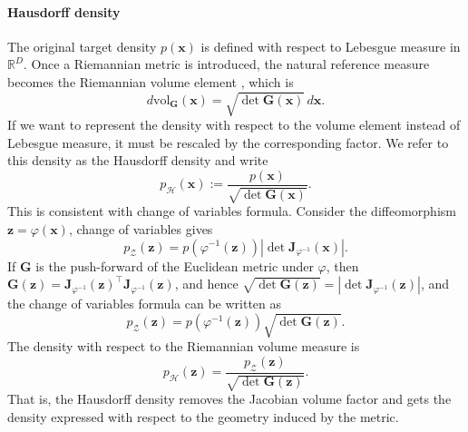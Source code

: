 \paragraph{Hausdorff density}
The original target density $p(\boldsymbol{x})$ is defined with respect to Lebesgue measure in $\mathbb{R}^D$. Once a Riemannian metric is introduced, the natural reference measure becomes the Riemannian volume element \citep{Lee2018}, which is
\begin{equation*}
    d\mathrm{vol}_{\mathbf{G}}(\boldsymbol{x}) = \sqrt{\det \mathbf{G}(\boldsymbol{x})}\,d\boldsymbol{x}.
\end{equation*}
If we want to represent the density with respect to the volume element instead of Lebesgue measure, it must be rescaled by the corresponding factor.  We refer to this density as the Hausdorff density and write
\begin{equation} 
  p_{\mathcal{H}}(\boldsymbol{x}) := \frac{p(\boldsymbol{x})}{\sqrt{\det \mathbf{G}(\boldsymbol{x})}}. \label{eq:hausdensity}
\end{equation}
This is consistent with change of variables formula. Consider the  diffeomorphism  $\boldsymbol{z} = \varphi(\boldsymbol{x})$, change of variables gives
\begin{equation*}
    p_{\mathcal{Z}}(\boldsymbol{z}) = p(\varphi^{-1}(\boldsymbol{z})) \left|\det \mathbf{J}_{\varphi^{-1}}(\boldsymbol{x})\right|.
\end{equation*}
If $\mathbf{G}$ is the push-forward of the Euclidean metric under $\varphi$, then $\mathbf{G}(\boldsymbol{z})  = \mathbf{J}_{\varphi^{-1}}(\boldsymbol{z})^\top
    \mathbf{J}_{\varphi^{-1}}(\boldsymbol{z})$, and hence $\sqrt{\det \mathbf{G}(\boldsymbol{z})} = \left|\det \mathbf{J}_{\varphi^{-1}}(\boldsymbol{z})\right|$, and the change of variables formula can be written as
\begin{equation*}
    p_{\mathcal{Z}}(\boldsymbol{z}) = p(\varphi^{-1}(\boldsymbol{z}))  \sqrt{\det \mathbf{G}(\boldsymbol{z})}.
\end{equation*}
The density with respect to the Riemannian volume measure is
\begin{equation*}
    p_{\mathcal H}(\boldsymbol{z})
    =
    \frac{p_{\mathcal{Z}}(\boldsymbol{z})}{\sqrt{\det \mathbf{G}(\boldsymbol{z})}}. 
\end{equation*}
That is, the Hausdorff density removes the Jacobian volume factor and gets the density expressed with respect to the geometry induced by the metric.




